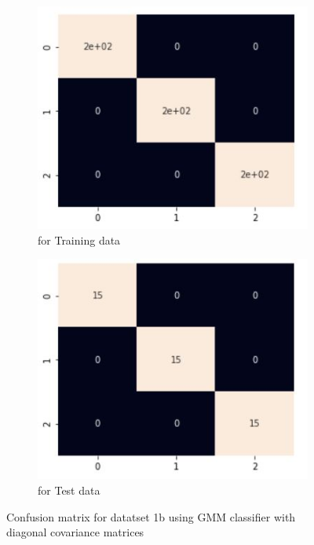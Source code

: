 \documentclass[11pt]{article}
\begin{document}
\begin{figure}[h]
\centering
	\begin{subfigure}[b]{0.45\textwidth}
	\centering
	\includegraphics[scale=0.5]{dataset1b_gmm_diagonal_hm_train.jpg}
	\caption{for Training data}
	\label{fig:fig2.2.3.1}
	\end{subfigure}
	\hfill
	\begin{subfigure}[b]{0.45\textwidth}
	\centering
	\includegraphics[scale=0.5]{dataset1b_gmm_diagonal_hm_test.jpg}
	\caption{for Test data}
	\label{fig:fig2.2.3.2}
	\end{subfigure}
\caption{Confusion matrix for datatset 1b using GMM classifier with diagonal covariance matrices}
\label{fig:fig1.2.1}
\end{figure}
\end{document}
